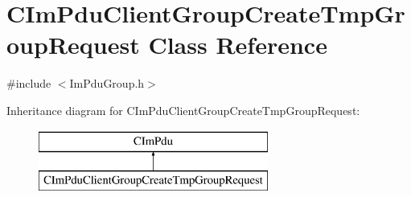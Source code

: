 \hypertarget{class_c_im_pdu_client_group_create_tmp_group_request}{}\section{C\+Im\+Pdu\+Client\+Group\+Create\+Tmp\+Group\+Request Class Reference}
\label{class_c_im_pdu_client_group_create_tmp_group_request}


{\ttfamily \#include $<$Im\+Pdu\+Group.\+h$>$}

Inheritance diagram for C\+Im\+Pdu\+Client\+Group\+Create\+Tmp\+Group\+Request\+:\begin{figure}[H]
\begin{center}
\leavevmode
\includegraphics[height=2.000000cm]{class_c_im_pdu_client_group_create_tmp_group_request}
\end{center}
\end{figure}
